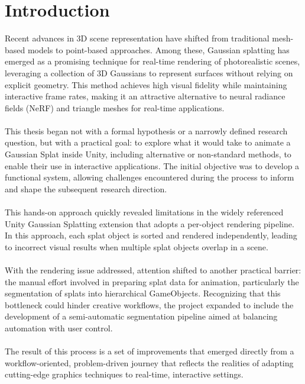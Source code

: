 \documentclass[12pt]{article}
\begin{document}
\section{Introduction}
Recent advances in 3D scene representation have shifted from traditional mesh-based models to point-based approaches. Among these, Gaussian splatting \cite{OriginalSplatting} has emerged as a promising technique for real-time rendering of photorealistic scenes, leveraging a collection of 3D Gaussians to represent surfaces without relying on explicit geometry. This method achieves high visual fidelity while maintaining interactive frame rates, making it an attractive alternative to neural radiance fields (NeRF) and triangle meshes for real-time applications.
\\\\
This thesis began not with a formal hypothesis or a narrowly defined research question, but with a practical goal: to explore what it would take to animate a Gaussian Splat inside Unity, including alternative or non-standard methods, to enable their use in interactive applications. The initial objective was to develop a functional system, allowing challenges encountered during the process to inform and shape the subsequent research direction.
\\\\
This hands-on approach quickly revealed limitations in the widely referenced Unity Gaussian Splatting extension \cite{Aras} that adopts a per-object rendering pipeline. In this approach, each splat object is sorted and rendered independently, leading to incorrect visual results when multiple splat objects overlap in a scene.
\\\\
With the rendering issue addressed, attention shifted to another practical barrier: the manual effort involved in preparing splat data for animation, particularly the segmentation of splats into hierarchical GameObjects. Recognizing that this bottleneck could hinder creative workflows, the project expanded to include the development of a semi-automatic segmentation pipeline aimed at balancing automation with user control.
\\\\
The result of this process is a set of improvements that emerged directly from a workflow-oriented, problem-driven journey that reflects the realities of adapting cutting-edge graphics techniques to real-time, interactive settings.
\\\\
\end{document}

